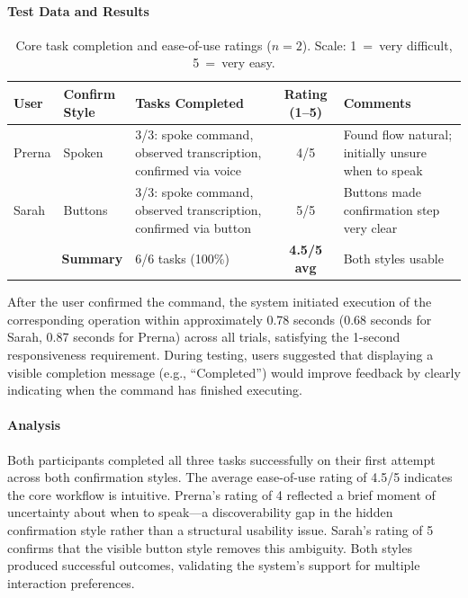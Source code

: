 \documentclass[12pt, titlepage]{article}
\begin{document}
\paragraph{Test Data and Results}

\begin{table}[H]
\centering
\caption{Core task completion and ease-of-use ratings ($n=2$).
  Scale: 1~=~very difficult, 5~=~very easy.}
\begin{tabular}{|l|l|p{4.5cm}|c|p{3.5cm}|}
\hline
\textbf{User} & \textbf{Confirm Style} & \textbf{Tasks Completed} &
  \textbf{Rating (1--5)} & \textbf{Comments} \\ \hline
Prerna & Spoken &
  3/3: spoke command, observed transcription, confirmed via voice &
  4/5 &
  Found flow natural; initially unsure when to speak \\ \hline
Sarah & Buttons &
  3/3: spoke command, observed transcription, confirmed via button &
  5/5 &
  Buttons made confirmation step very clear \\ \hline
\multicolumn{2}{|r|}{\textbf{Summary}} &
  6/6 tasks (100\%) & \textbf{4.5/5 avg} & Both styles usable \\ \hline
\end{tabular}
\label{tab:uh1}
\end{table}

After the user confirmed the command, the system initiated execution of the corresponding operation within approximately 0.78 seconds (0.68 seconds for Sarah, 0.87 seconds for Prerna) across all trials, satisfying the 1-second responsiveness requirement. During testing, users suggested that displaying a visible completion message (e.g., ``Completed'') would improve feedback by clearly indicating when the command has finished executing.

\paragraph{Analysis}
Both participants completed all three tasks successfully on their first
attempt across both confirmation styles. The average ease-of-use rating of
4.5/5 indicates the core workflow is intuitive. Prerna's rating of 4
reflected a brief moment of uncertainty about when to speak---a
discoverability gap in the hidden confirmation style rather than a structural
usability issue. Sarah's rating of 5 confirms that the visible button style
removes this ambiguity. Both styles produced successful outcomes, validating
the system's support for multiple interaction preferences.
\end{document}
